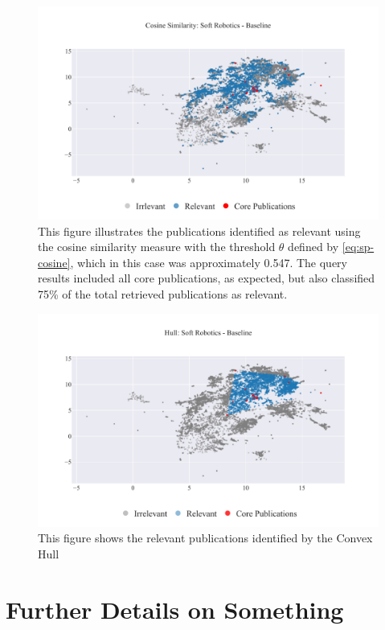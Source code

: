 \documentclass[%
  a4paper,fontsize=11pt,abstract=on,%
  oneside,BCOR=19mm,%
]{scrreprt}
\begin{document}
\begin{figure}[!h]
	\centering	
	\includegraphics[scale=0.7]{pics/sr-cosine-baseline.pdf}
	\caption[Semantic Cosine Similarity: Soft Robotics]{This figure illustrates the publications identified as relevant using the cosine similarity measure with the threshold $\theta$ defined by \autoref{eq:sp-cosine}, which in this case was approximately 0.547. The query results included all core publications, as expected, but also classified 75\% of the total retrieved publications as relevant.}\label{fig:sr-cosine-baseline}
\end{figure}



\begin{figure}
	\centering	
	\includegraphics[scale=0.7]{pics/sr-hull-baseline.pdf}
	\caption[Semantic Cosine Threshold: Empirical Analysis]{This figure shows the relevant publications identified by the Convex Hull}\label{fig:sr-hull-baseline}
\end{figure}


\section{Further Details on Something}

\printbibliography


\end{document}

